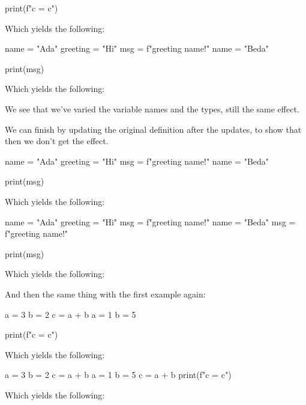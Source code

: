 \begin{description}
\begin{minipage}[t]{0.45\columnwidth}
\begin{pyblock}[varstateG1]
print(f"c = {c}")
        \end{pyblock}
        Which yields the following:
        \printpythontex[verbatim]
      \end{minipage}
      \hfill
      \begin{minipage}[t]{0.45\columnwidth}
        \begin{pyblock}[varstateG2]
name = "Ada"
greeting = "Hi"
msg = f"{greeting} {name}!"
name = "Beda"


print(msg)
        \end{pyblock}
        Which yields the following:
        \printpythontex[verbatim]
      \end{minipage}

      We see that we've varied the variable names and the types, still the same 
      effect.

      We can finish by updating the original definition after the updates, to 
      show that then we don't get the effect.

      \begin{minipage}[t]{0.45\columnwidth}
        \begin{pyblock}[varstateG2]
name = "Ada"
greeting = "Hi"
msg = f"{greeting} {name}!"
name = "Beda"


print(msg)
        \end{pyblock}
        Which yields the following:
        \printpythontex[verbatim]
      \end{minipage}
      \hfill
      \begin{minipage}[t]{0.45\columnwidth}
        \begin{pyblock}[varstateG2][highlightlines=5]
name = "Ada"
greeting = "Hi"
msg = f"{greeting} {name}!"
name = "Beda"
msg = f"{greeting} {name}!"

print(msg)
        \end{pyblock}
        Which yields the following:
        \printpythontex[verbatim]
      \end{minipage}

      And then the same thing with the first example again:

      \begin{minipage}[t]{0.45\columnwidth}
        \begin{pyblock}[varstateG1]
a = 3
b = 2
c = a + b
a = 1
b = 5

print(f"c = {c}")
        \end{pyblock}
        Which yields the following:
        \printpythontex[verbatim]
      \end{minipage}
      \hfill
      \begin{minipage}[t]{0.45\columnwidth}
        \begin{pyblock}[varstateG1][highlightlines=6]
a = 3
b = 2
c = a + b
a = 1
b = 5
c = a + b
print(f"c = {c}")
        \end{pyblock}
        Which yields the following:
        \printpythontex[verbatim]
      \end{minipage}
\end{description}


